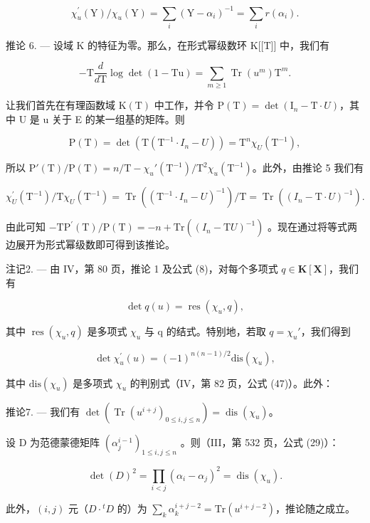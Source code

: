 \[
\chi_ {u} ^ {\prime} (\mathrm{Y}) / \chi_ {u} (\mathrm{Y}) = \sum_ {i} \left(\mathrm{Y} - \alpha_ {i}\right) ^ {- 1} = \sum_ {i} r \left(\alpha_ {i}\right).
\]

推论 6. --- 设域 K 的特征为零。那么，在形式幂级数环 K{[}{[}T{]}{]} 中，我们有

\[
- \mathrm{T} \frac {d}{d \mathrm{T}} \log \det (1 - \mathrm{Tu}) = \sum_ {m \geqslant 1} \operatorname{Tr} \left(u ^ {m}\right) \mathrm{T} ^ {m}.
\]

让我们首先在有理函数域 \(\mathrm{K}(\mathrm{T})\) 中工作，并令 \(\mathrm{P}(\mathrm{T}) = \det(\mathrm{I}_{n} - \mathrm{T} \cdot U)\)，其中 U 是 u 关于 E 的某一组基的矩阵。则

\[
\mathrm{P} (\mathrm{T}) = \det \left(\mathrm{T} \left(\mathrm{T} ^ {- 1} \cdot I _ {n} - U\right)\right) = \mathrm{T} ^ {n} \chi_ {U} \left(\mathrm{T} ^ {- 1}\right),
\]

所以 \(\mathrm{P}'(\mathrm{T}) / \mathrm{P}(\mathrm{T}) = n / \mathrm{T} - \chi_u'(\mathrm{T}^{-1}) / \mathrm{T}^2\chi_u(\mathrm{T}^{-1})\)。此外，由推论 5 我们有

\[
\chi_ {U} ^ {\prime} \left(\mathrm{T} ^ {- 1}\right) / \mathrm{T} \chi_ {U} \left(\mathrm{T} ^ {- 1}\right) = \operatorname{Tr} \left(\left(\mathrm{T} ^ {- 1} \cdot I _ {n} - U\right) ^ {- 1}\right) / \mathrm{T} = \operatorname{Tr} \left(\left(I _ {n} - \mathrm{T} \cdot U\right) ^ {- 1}\right).
\]

由此可知 \(-\mathrm{TP}^{\prime}(\mathrm{T})/\mathrm{P}(\mathrm{T})=-n+\mathrm{Tr}\left((I_{n}-\mathrm{T}U)^{-1}\right)\) 。现在通过将等式两边展开为形式幂级数即可得到该推论。

注记2. --- 由 IV，第 80 页，推论 1 及公式 (8)，对每个多项式 \(q \in \mathbf{K}[\mathbf{X}]\)，我们有

\[
\det q (u) = \operatorname{res} \left(\chi_ {u}, q\right),\tag{9}
\]

其中 \(\operatorname{res}(\chi_{u}, q)\) 是多项式 \(\chi_{u}\) 与 q 的结式。特别地，若取 \(q = \chi_{u}'\)，我们得到

\[
\det \chi_ {u} ^ {\prime} (u) = (- 1) ^ {n (n - 1) / 2} \mathrm{dis} (\chi_ {u}),\tag{10}
\]

其中 \(\mathrm{dis}(\chi_{u})\) 是多项式 \(\chi_{u}\) 的判别式（IV，第 82 页，公式 (47)）。此外：

推论7. --- 我们有 \(\det\left(\operatorname{Tr}\left(u^{i+j}\right)_{0\leqslant i,j\leqslant n}\right)=\operatorname{dis}\left(\chi_{u}\right)\)。

设 D 为范德蒙德矩阵 \((\alpha_j^{i-1})_{1 \leqslant i, j \leqslant n}\) 。则（III，第 532 页，公式 (29)）：

\[
\det (D) ^ {2} = \prod_ {i <   j} (\alpha_ {i} - \alpha_ {j}) ^ {2} = \operatorname{dis} (\chi_ {u}).
\]

此外，\((i,j)\) 元（\(D\cdot {}^t D\) 的）为 \(\sum_{k}\alpha_{k}^{i + j - 2} = \mathrm{Tr}(u^{i + j - 2})\)，推论随之成立。

